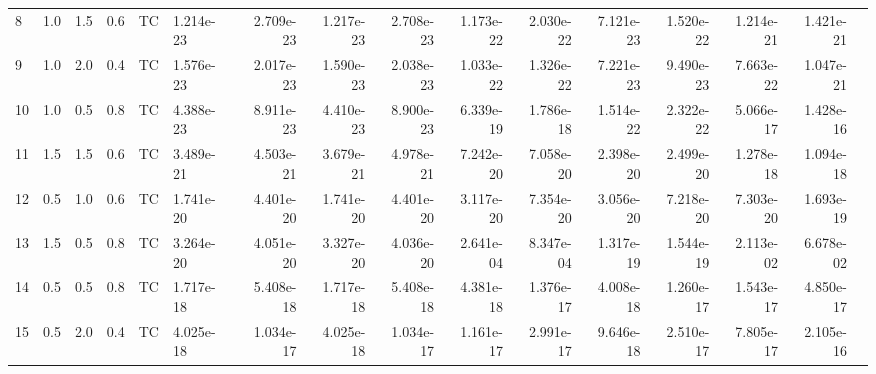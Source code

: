 \begin{tabular}{lrrrllrrrrrrrrrr}
8  & 1.0   & 1.5   & 0.6 & TC        & 1.214e-23                                 & 2.709e-23                          & 1.217e-23                         & 2.708e-23                           & 1.173e-22 & 2.030e-22 & 7.121e-23 & 1.520e-22 & 1.214e-21 & 1.421e-21 \\
9  & 1.0   & 2.0   & 0.4 & TC        & 1.576e-23                                 & 2.017e-23                          & 1.590e-23                         & 2.038e-23                           & 1.033e-22 & 1.326e-22 & 7.221e-23 & 9.490e-23 & 7.663e-22 & 1.047e-21 \\
10  & 1.0   & 0.5   & 0.8 & TC        & 4.388e-23                                 & 8.911e-23                          & 4.410e-23                         & 8.900e-23                           & 6.339e-19 & 1.786e-18 & 1.514e-22 & 2.322e-22 & 5.066e-17 & 1.428e-16 \\
11 & 1.5   & 1.5   & 0.6 & TC        & 3.489e-21                                 & 4.503e-21                          & 3.679e-21                         & 4.978e-21                           & 7.242e-20 & 7.058e-20 & 2.398e-20 & 2.499e-20 & 1.278e-18 & 1.094e-18 \\
12 & 0.5   & 1.0   & 0.6 & TC        & 1.741e-20                                 & 4.401e-20                          & 1.741e-20                         & 4.401e-20                           & 3.117e-20 & 7.354e-20 & 3.056e-20 & 7.218e-20 & 7.303e-20 & 1.693e-19 \\
13 & 1.5   & 0.5   & 0.8 & TC        & 3.264e-20                                 & 4.051e-20                          & 3.327e-20                         & 4.036e-20                           & 2.641e-04 & 8.347e-04 & 1.317e-19 & 1.544e-19 & 2.113e-02 & 6.678e-02 \\
14 & 0.5   & 0.5   & 0.8 & TC        & 1.717e-18                                 & 5.408e-18                          & 1.717e-18                         & 5.408e-18                           & 4.381e-18 & 1.376e-17 & 4.008e-18 & 1.260e-17 & 1.543e-17 & 4.850e-17 \\
15 & 0.5   & 2.0   & 0.4 & TC        & 4.025e-18                                 & 1.034e-17                          & 4.025e-18                         & 1.034e-17                           & 1.161e-17 & 2.991e-17 & 9.646e-18 & 2.510e-17 & 7.805e-17 & 2.105e-16 \\
\bottomrule
\end{tabular}
